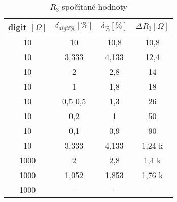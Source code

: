   \begin{table}[H]
    \centering
    \begin{tabular}[h]{|c|c|c|c|}
      \hline
      digit $[\Omega]$ & $\delta _{digit\%} [\%]$ & $\delta _\% [\%]$ & $\Delta R_3 [\Omega]$ \\
      \hline
      10 & 10 & 10,8 & 10,8 \\
      10 & 3,333 & 4,133 & 12,4 \\
      10 & 2 & 2,8 & 14  \\
      10 & 1 & 1,8 & 18 \\
      10 & 0,5 0,5 & 1,3 & 26 \\
      10 & 0,2 & 1 & 50 \\
      10 & 0,1 & 0,9 & 90 \\
      10 & 3,333 & 4,133 & 1,24 k \\
      1000 & 2 & 2,8 & 1,4 k\\
      1000 & 1,052 & 1,853 & 1,76 k \\
      1000 & - & - & - \\
      \hline
    \end{tabular}
    \caption{$R_3$ spočítané hodnoty}
  \end{table}
